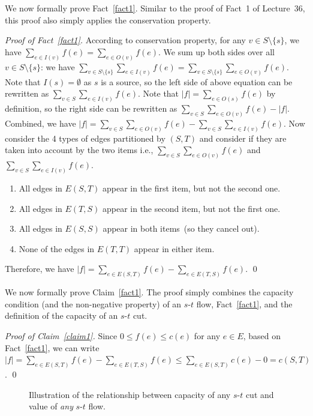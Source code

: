 We now formally prove Fact~\ref{fact1}. 
Similar to the proof of Fact~1 of Lecture~36, this proof also simply applies the conservation property.

\emph{Proof of Fact~\ref{fact1}.} According to conservation property, for any $v\in S\setminus \{s\}$,
we have $\sum_{e\in I(v)} f(e) = \sum_{e\in O(v)} f(e)$. 
We sum up both sides over all $v\in S\setminus\{s\}$: 
we have $\sum_{v\in S\setminus\{s\}} \sum_{e\in I(v)} f(e) = \sum_{v\in S\setminus\{s\}} \sum_{e\in O(v)} f(e)$. 
Note that $I(s) = \emptyset$ as $s$ is a source, so the left side of above equation can be rewritten as $\sum_{v\in S} \sum_{e\in I(v)} f(e)$.
Note that $|f| = \sum_{e\in O(s)} f(e)$ by definition, so the right side can be rewritten as $\sum_{v\in S} \sum_{e\in O(v)} f(e) - |f|$.
Combined, we have $|f| = \sum_{v\in S} \sum_{e\in O(v)} f(e) - \sum_{v\in S} \sum_{e\in I(v)} f(e)$. 
Now consider the 4 types of edges partitioned by $(S, T)$ and consider if they are taken into account by the two items
i.e., $\sum_{v\in S} \sum_{e\in O(v)} f(e)$ and $\sum_{v\in S} \sum_{e\in I(v)} f(e)$. 
\begin{enumerate}
\item All edges in $E(S, T)$ appear in the first item, but not the second one.
\item All edges in $E(T, S)$ appear in the second item, but not the first one.
\item All edges in $E(S, S)$ appear in both items~(so they cancel out).
\item None of the edges in $E(T, T)$ appear in either item.
\end{enumerate}
Therefore, we have $|f| = \sum_{e\in E(S, T)} f(e) - \sum_{e\in E(T, S)} f(e)$. \qed

We now formally prove Claim~\ref{fact1}. The proof simply combines the capacity condition (and the non-negative property) of an $s$-$t$ flow,
Fact~\ref{fact1}, and the definition of the capacity of an $s$-$t$ cut.

\emph{Proof of Claim~\ref{claim1}.} Since $0\le f(e) \le c(e)$ for any $e\in E$,
based on Fact~\ref{fact1}, we can write
$|f| = \sum_{e\in E(S, T)} f(e) - \sum_{e\in E(T, S)} f(e)
\le \sum_{e\in E(S, T)} c(e) - 0 = c(S, T)$. \qed

\begin{figure}[!b]
\centering{}
\caption{Illustration of the relationship between capacity of any $s$-$t$ cut
and value of \emph{any} $s$-$t$ flow.}
\label{fig:flow-meet}
\end{figure}

